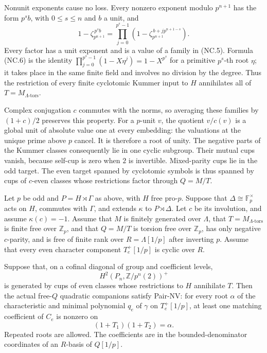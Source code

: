 Nonunit exponents cause no loss.  Every nonzero exponent modulo
\(p^{n+1}\) has the form \(p^s b\), with \(0\leq s\leq n\) and
\(b\) a unit, and
\[
 1-\zeta_{p^{n+1}}^{\,p^s b}
  =\prod_{j=0}^{p^s-1}
       \left(1-\zeta_{p^{n+1}}^{\,b+jp^{n+1-s}}\right).
                                                               \tag{NC.6}
\]
Every factor has a unit exponent and is a value of a family in
(NC.5).  Formula (NC.6) is the identity
\(\prod_{j=0}^{p^s-1}(1-X\eta^j)=1-X^{p^s}\) for a primitive
\(p^s\)-th root \(\eta\); it takes place in the same finite field
and involves no division by the degree.  Thus the restriction of
every finite cyclotomic Kummer input to \(H\) annihilates all of
\(T=M_{\Lambda\text{-tors}}\).

Complex conjugation \(c\) commutes with the norms, so averaging
these families by \((1+c)/2\) preserves this property.
For a \(p\)-unit \(v\), the quotient \(v/c(v)\) is a global unit
of absolute value one at every embedding: the valuations at the
unique prime above \(p\) cancel.  It is therefore a root of unity.
The negative parts of the Kummer classes consequently lie in one
cyclic subgroup.  Their mutual cups vanish, because self-cup is
zero when \(2\) is invertible.  Mixed-parity cups lie in the odd
target.  The even target spanned by cyclotomic symbols is thus
spanned by cups of \(c\)-even classes whose restrictions factor
through \(Q=M/T\).

\begin{proposition}\label{prop:universal-pair}
Let \(p\) be odd and \(P=H\rtimes\Gamma\) as above, with \(H\)
free pro-\(p\).  Suppose that
\(\Delta\cong\mathbb F_p^\times\) acts on \(H\), commutes with
\(\Gamma\), and extends \(\kappa\) to \(P\rtimes\Delta\).
Let \(c\) be its involution, and assume \(\kappa(c)=-1\).
Assume that \(M\) is finitely generated over \(\Lambda\), that
\(T=M_{\Lambda\text{-tors}}\) is finite free over \(\mathbb Z_p\),
and that \(Q=M/T\) is torsion free over \(\mathbb Z_p\), has only
negative \(c\)-parity, and is free of finite rank over
\(R=\Lambda[1/p]\) after inverting \(p\).
Assume that every even character component \(T_e^+[1/p]\) is
cyclic over \(R\).

Suppose that, on a cofinal diagonal of group and coefficient
levels,
\[
 H^2(P_n,\mathbb Z/p^n(2))^+
\]
is generated by cups of even classes whose restrictions to \(H\)
annihilate \(T\).  Then the actual free-\(Q\) quadratic companions
satisfy Pair-NV: for every root \(\alpha\) of the characteristic
and minimal polynomial \(q_e\) of \(\gamma\) on
\(T_e^+[1/p]\), at least one matching coefficient of \(C_e\) is
nonzero on
\[
                     (1+T_1)(1+T_2)=\alpha.                \tag{NC.7}
\]
Repeated roots are allowed.  The coefficients are in the
bounded-denominator coordinates of an \(R\)-basis of \(Q[1/p]\).
\end{proposition}

